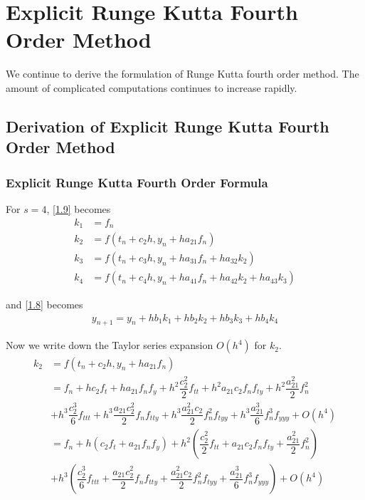 \documentclass[a4paper,oneside]{book}
\numberwithin{equation}{chapter}
\begin{document}
\chapter{Explicit Runge Kutta Fourth Order Method}
We continue to derive the formulation of Runge Kutta fourth order method. The amount of complicated computations continues to increase rapidly.
\section{Derivation of Explicit Runge Kutta Fourth Order Method}
\subsection{Explicit Runge Kutta Fourth Order Formula}
For $s=4$, \eqref{1.9} becomes
\begin{align}
{k_1} &= {f_n}\\
{k_2} &= f\left( {{t_n} + {c_2}h,{y_n} + h{a_{21}}{f_n}} \right)\\
{k_3} &= f\left( {{t_n} + {c_3}h,{y_n} + h{a_{31}}{f_n} + h{a_{32}}{k_2}} \right)\\
{k_4} &= f\left( {{t_n} + {c_4}h,{y_n} + h{a_{41}}{f_n} + h{a_{42}}{k_2} + h{a_{43}}{k_3}} \right)
\end{align}

and \eqref{1.8} becomes
\begin{align}
\label{4.5}
{{y_{n + 1}}} = {{y_n}} + h{b_1}{k_1} + h{b_2}{k_2} + h{b_3}{k_3} + h{b_4}{k_4} 
\end{align}

Now we write down the Taylor series expansion $O\left(h^4\right)$ for $k_2$.
\begin{align}
{k_2} &= f\left( {{t_n} + {c_2}h,{y_n} + h{a_{21}}{f_n}} \right)\\
 &= {f_n} + h{c_2}{f_t} + h{a_{21}}{f_n}{f_y} + {h^2}\dfrac{{c_2^2}}{2}{f_{tt}} + {h^2}{a_{21}}{c_2}{f_n}{f_{ty}} + {h^2}\dfrac{{a_{21}^2}}{2}f_n^2\\
 &+ {h^3}\dfrac{{c_2^3}}{6}{f_{ttt}} + {h^3}\dfrac{{{a_{21}}c_2^2}}{2}{f_n}{f_{tty}} + {h^3}\dfrac{{a_{21}^2{c_2}}}{2}f_n^2{f_{tyy}} + {h^3}\dfrac{{a_{21}^3}}{6}f_n^3{f_{yyy}} + O\left( {{h^4}} \right)\\
 &= {f_n} + h\left( {{c_2}{f_t} + {a_{21}}{f_n}{f_y}} \right) + {h^2}\left( {\dfrac{{c_2^2}}{2}{f_{tt}} + {a_{21}}{c_2}{f_n}{f_{ty}} + \dfrac{{a_{21}^2}}{2}f_n^2} \right)\\
 &+ {h^3}\left( {\dfrac{{c_2^3}}{6}{f_{ttt}} + \dfrac{{{a_{21}}c_2^2}}{2}{f_n}{f_{tty}} + \dfrac{{a_{21}^2{c_2}}}{2}f_n^2{f_{tyy}} + \dfrac{{a_{21}^3}}{6}f_n^3{f_{yyy}}} \right) + O\left( {{h^4}} \right)
 \label{4.10}
\end{align}
\end{document}
